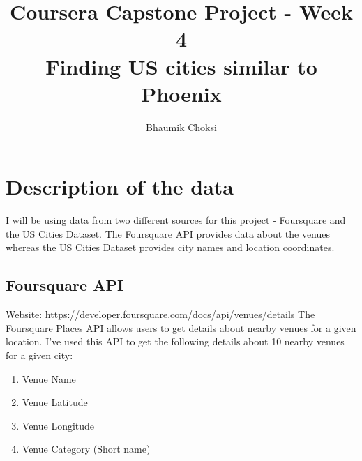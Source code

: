 \documentclass[12pt, a4paper]{article}
\title{Coursera Capstone Project - Week 4\\ \textbf{Finding US cities similar to Phoenix} }
\author{Bhaumik Choksi}
\begin{document}
	\maketitle
	
	
%	
%	
%	
%	

\section*{Description of the data}
I will be using data from two different sources for this project - Foursquare and the US Cities Dataset. The Foursquare API provides data about the venues whereas the US Cities Dataset provides city names and location coordinates. 

\subsection*{Foursquare API}
Website: \href{https://developer.foursquare.com/docs/api/venues/details}{https://developer.foursquare.com/docs/api/venues/details}
\newline
The Foursquare Places API allows users to get details about nearby venues for a given location. I've used this API to get the following details about 10 nearby venues for a given city:
\begin{enumerate}
	\item Venue Name
	\item Venue Latitude
	\item Venue Longitude
	\item Venue Category (Short name)
\end{enumerate}
\end{document}
